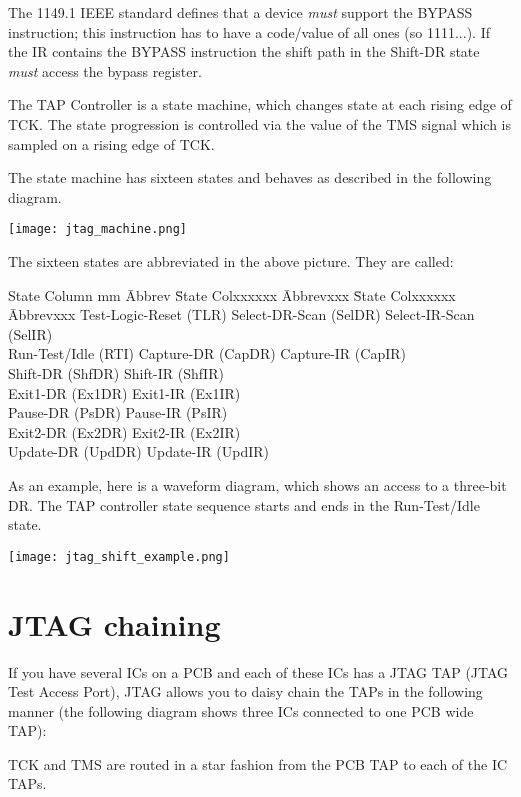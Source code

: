 \documentclass[10pt,english,a4paper]{report}
\begin{document}
The 1149.1 IEEE standard defines that a device {\em must} support the BYPASS instruction; this instruction has to have a code/value of all ones (so 1111...).
If the IR contains the BYPASS instruction the shift path in the Shift-DR state {\em must} access the bypass register.

\newpage
The TAP Controller is a state machine, which changes state at each
rising edge of TCK. The state progression is controlled via
the value of the TMS signal which is sampled on a rising edge of TCK.

The state machine has sixteen states and behaves as described in the
following diagram.
\begin{center}
	\texttt{[image: jtag\_machine.png]}
\end{center}
The sixteen states are abbreviated in the above picture. They are called:
\begin{tabbing}
State Column mm \= Abbrev \= State Colxxxxxx \= Abbrevxxx \= State Colxxxxxx \= Abbrevxxx \kill
Test-Logic-Reset \> (TLR) \> Select-DR-Scan  \> (SelDR) \> Select-IR-Scan  \> (SelIR) \\
Run-Test/Idle    \> (RTI) \> Capture-DR      \> (CapDR) \> Capture-IR      \> (CapIR) \\
                 \>       \> Shift-DR        \> (ShfDR) \> Shift-IR        \> (ShfIR) \\
                 \>       \> Exit1-DR        \> (Ex1DR) \> Exit1-IR        \> (Ex1IR) \\
                 \>       \> Pause-DR        \> (PsDR)  \> Pause-IR        \> (PsIR)  \\
                 \>       \> Exit2-DR        \> (Ex2DR) \> Exit2-IR        \> (Ex2IR) \\
                 \>       \> Update-DR       \> (UpdDR) \> Update-IR       \> (UpdIR) \\
\end{tabbing}

As an example, here is a waveform diagram, which shows an access to a three-bit DR.
The TAP controller state sequence starts and ends in the Run-Test/Idle state.
\begin{center}
	\texttt{[image: jtag\_shift\_example.png]}
\end{center}

\newpage
\section{JTAG chaining}
If you have several ICs on a PCB and each of these ICs has a JTAG TAP (JTAG Test Access Port), JTAG allows you
to daisy chain the TAPs in the following manner (the following diagram shows three ICs connected to one PCB wide TAP):
\begin{center}
	
\end{center}
TCK and TMS are routed in a star fashion from the PCB TAP to each of the IC TAPs.
\end{document}
